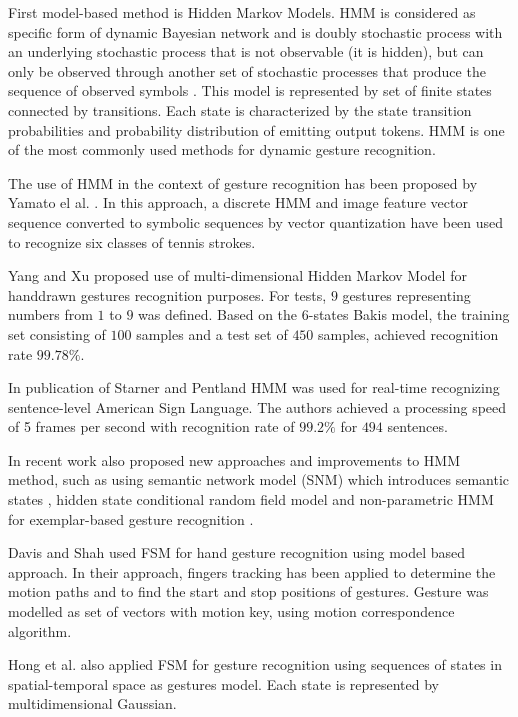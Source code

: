 First model-based method is Hidden Markov Models. HMM is considered as specific form of dynamic Bayesian network and is doubly stochastic process with an underlying stochastic process that is not observable (it is hidden), but can only be observed through another set of stochastic processes that produce the sequence of observed symbols \cite{RabinerHmmIntro}. This model is represented by set of finite states connected by transitions. Each state is characterized by the state transition probabilities and probability distribution of emitting output tokens. HMM is one of the most commonly used methods for dynamic gesture recognition.

The use of HMM in the context of gesture recognition has been proposed by Yamato el al. \cite{YamatoComputerVision}. In this approach, a discrete HMM and image feature vector sequence converted to symbolic sequences by vector quantization have been used to recognize six classes of tennis strokes.

Yang and Xu \cite{Yang_1994_329} proposed use of multi-dimensional Hidden Markov Model for handdrawn gestures recognition purposes. For tests, $9$ gestures representing numbers from $1$ to $9$ was defined. Based on the $6$-states Bakis model, the training set consisting of $100$ samples and a test set of $450$ samples, achieved recognition rate $99.78\%$.

In publication of Starner and Pentland \cite{StarnerComputerVision} HMM was used for real-time recognizing sentence-level American Sign Language. The authors achieved a processing speed of 5 frames per second with recognition rate of $99.2\%$ for $494$ sentences.

In recent work also proposed new approaches and improvements to HMM method, such as using semantic network model (SNM) which introduces semantic states \cite{RajkoComputerVision}, hidden state conditional random field model \cite{WangComputerVision} and non-parametric HMM for exemplar-based gesture recognition \cite{Elgammal:2003:LDE:1965841.1965916}.

Davis and Shah \cite{Davis94visualgesture} used FSM for hand gesture recognition using model based approach. In their approach, fingers tracking has been applied to determine the motion paths and to find the start and stop positions of gestures. Gesture was modelled as set of vectors with motion key, using motion correspondence algorithm.

Hong et al. \cite{Hong00constructingfinite} also applied FSM for gesture recognition using sequences of states in spatial-temporal space as gestures model. Each state is represented by multidimensional Gaussian.

